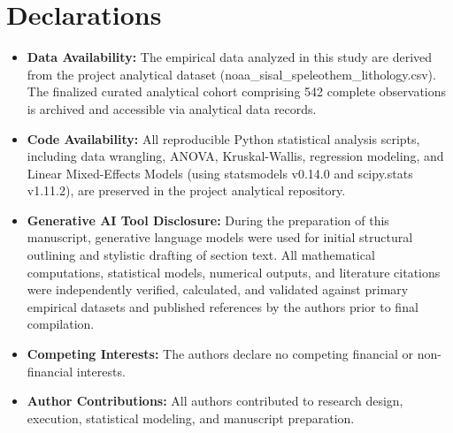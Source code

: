 \documentclass[sn-basic,Numbered]{sn-jnl}%
\begin{document}
\section*{Declarations}
\begin{itemize}
    \item \textbf{Data Availability:} The empirical data analyzed in this study are derived from the project analytical dataset (noaa\_sisal\_speleothem\_lithology.csv). The finalized curated analytical cohort comprising 542 complete observations is archived and accessible via analytical data records.
    \item \textbf{Code Availability:} All reproducible Python statistical analysis scripts, including data wrangling, ANOVA, Kruskal-Wallis, regression modeling, and Linear Mixed-Effects Models (using statsmodels v0.14.0 and scipy.stats v1.11.2), are preserved in the project analytical repository.
    \item \textbf{Generative AI Tool Disclosure:} During the preparation of this manuscript, generative language models were used for initial structural outlining and stylistic drafting of section text. All mathematical computations, statistical models, numerical outputs, and literature citations were independently verified, calculated, and validated against primary empirical datasets and published references by the authors prior to final compilation.
    \item \textbf{Competing Interests:} The authors declare no competing financial or non-financial interests.
    \item \textbf{Author Contributions:} All authors contributed to research design, execution, statistical modeling, and manuscript preparation.
\end{itemize}


\end{document}
